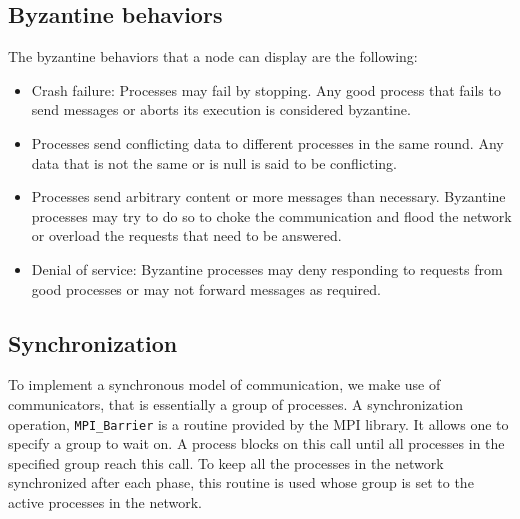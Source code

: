 \subsection{Byzantine behaviors}
The byzantine behaviors that a node can display are the following:
\begin{itemize}
    \item Crash failure: Processes may fail by stopping. Any good process that fails to send messages or aborts its execution is considered byzantine.
    \item Processes send conflicting data to different processes in the same round. Any data that is not the same or is null is said to be conflicting.
    \item Processes send arbitrary content or more messages than necessary. Byzantine processes may try to do so to choke the communication and flood the network or overload the requests that need to be answered.
    \item Denial of service: Byzantine processes may deny responding to requests from good processes or may not forward messages as required. 
\end{itemize}

\subsection{Synchronization}
To implement a synchronous model of communication, we make use of communicators, that is essentially a group of processes. A synchronization operation, \texttt{MPI\_Barrier} is a routine provided by the MPI library. It allows one to specify a group to wait on. A process blocks on this call until all processes in the specified group reach this call. To keep all the processes in the network synchronized after each phase, this routine is used whose group is set to the active processes in the network.



